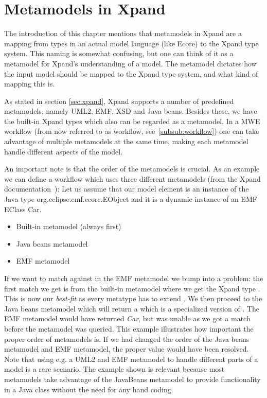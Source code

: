 \section{Metamodels in Xpand}
The introduction of this chapter mentions that metamodels in Xpand are a mapping from types in an actual model language (like Ecore) to the Xpand type system. This naming is somewhat confusing, but one can think of it as a metamodel for Xpand's understanding of a model. The metamodel dictates how the input model should be mapped to the Xpand type system, and what kind of mapping this is.

As stated in section \ref{sec:xpand}, Xpand supports a number of predefined metamodels, namely UML2, EMF, XSD and Java beans. Besides these, we have the built-in Xpand types which also can be regarded as a metamodel. In a MWE workflow (from now referred to as workflow, see~\ref{subsub:workflow}) one can take advantage of multiple metamodels at the same time, making each metamodel handle different aspects of the model. 

An important note is that the order of the metamodels is crucial. As an example we can define a workflow which uses three different metamodels (from the Xpand documentation~\cite{xpand}): 
Let us assume that our model element is an instance of the Java type org.eclipse.emf.ecore.EObject and it is a dynamic instance of an EMF EClass Car.
\begin{itemize}
  \item Built-in metamodel (always first)
  \item Java beans metamodel
  \item EMF metamodel
\end{itemize}
If we want to match  against  in the EMF metamodel we bump into a problem: the first match we get is from the built-in metamodel where we get the Xpand type . This is now our \emph{best-fit} as every metatype has to extend . We then proceed to the Java beans metamodel which will return a  which is a specialized version of . The EMF metamodel would have returned \emph{Car}, but was unable as we got a match before the metamodel was queried. This example illustrates how important the proper order of metamodels is. If we had changed the order of the Java beans metamodel and EMF metamodel, the proper value would have been resolved. Note that using e.g. a UML2 and EMF metamodel to handle different parts of a model is a rare scenario. The example shown is relevant because most metamodels take advantage of the JavaBeans metamodel to provide functionality in a Java class without the need for any hand coding.

